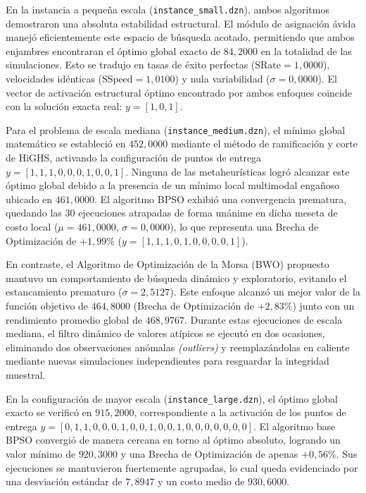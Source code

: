 \documentclass[final,5p,times,twocolumn]{elsarticle}
\begin{document}
En la instancia a pequeña escala (\texttt{instance\_small.dzn}), ambos algoritmos demostraron una absoluta estabilidad estructural. El módulo de asignación ávida manejó eficientemente este espacio de búsqueda acotado, permitiendo que ambos enjambres encontraran el óptimo global exacto de $84,2000$ en la totalidad de las simulaciones. Esto se tradujo en tasas de éxito perfectas ($\text{SRate} = 1,0000$), velocidades idénticas ($\text{SSpeed} = 1,0100$) y nula variabilidad ($\sigma = 0,0000$). El vector de activación estructural óptimo encontrado por ambos enfoques coincide con la solución exacta real: $y = [1, 0, 1]$.

Para el problema de escala mediana (\texttt{instance\_medium.dzn}), el mínimo global matemático se estableció en $452,0000$ mediante el método de ramificación y corte de HiGHS, activando la configuración de puntos de entrega $y = [1, 1, 1, 0, 0, 0, 1, 0, 0, 1]$. Ninguna de las metaheurísticas logró alcanzar este óptimo global debido a la presencia de un mínimo local multimodal engañoso ubicado en $461,0000$. El algoritmo BPSO exhibió una convergencia prematura, quedando las $30$ ejecuciones atrapadas de forma unánime en dicha meseta de costo local ($\mu = 461,0000$, $\sigma = 0,0000$), lo que representa una Brecha de Optimización de $+1,99\%$ ($y = [1, 1, 1, 0, 1, 0, 0, 0, 0, 1]$).

En contraste, el Algoritmo de Optimización de la Morsa (BWO) propuesto mantuvo un comportamiento de búsqueda dinámico y exploratorio, evitando el estancamiento prematuro ($\sigma = 2,5127$). Este enfoque alcanzó un mejor valor de la función objetivo de $464,8000$ (Brecha de Optimización de $+2,83\%$) junto con un rendimiento promedio global de $468,9767$. Durante estas ejecuciones de escala mediana, el filtro dinámico de valores atípicos se ejecutó en dos ocasiones, eliminando dos observaciones anómalas \textit{(outliers)} y reemplazándolas en caliente mediante nuevas simulaciones independientes para resguardar la integridad muestral.

En la configuración de mayor escala (\texttt{instance\_large.dzn}), el óptimo global exacto se verificó en $915,2000$, correspondiente a la activación de los puntos de entrega $y = [0, 1, 1, 0, 0, 0, 1, 0, 0, 1, 0, 0, 1, 0, 0, 0, 0, 0, 0, 0]$. El algoritmo base BPSO convergió de manera cercana en torno al óptimo absoluto, logrando un valor mínimo de $920,3000$ y una Brecha de Optimización de apenas $+0,56\%$. Sus ejecuciones se mantuvieron fuertemente agrupadas, lo cual queda evidenciado por una desviación estándar de $7,8947$ y un costo medio de $930,6000$.
\end{document}

